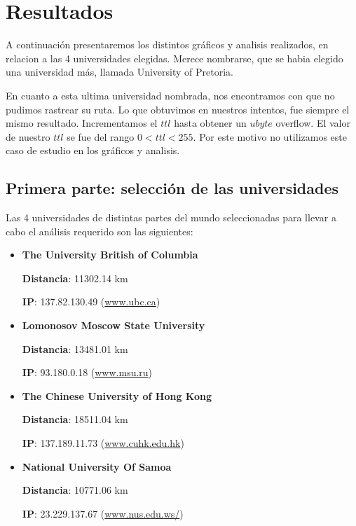 \section{Resultados}	
A continuaci\'on presentaremos los distintos gr\'aficos y analisis realizados, en relacion a las 4 universidades elegidas. Merece nombrarse, que se habia elegido una universidad m\'as, llamada University of Pretoria.

En cuanto a esta ultima universidad nombrada, nos encontramos con que no pudimos rastrear su ruta. Lo que obtuvimos en nuestros intentos, fue siempre el mismo resultado. Incrementamos el $ttl$ hasta obtener un $ubyte$ overflow. El valor de nuestro $ttl$ se fue del rango $0 < ttl < 255$.
Por este motivo no utilizamos este caso de estudio en los gr\'aficos y analisis.






\subsection{Primera parte: selección de las universidades}
Las 4 universidades de distintas partes del mundo seleccionadas para llevar a cabo el análisis requerido son las siguientes: 

\begin{itemize}
 \item {\bf The University British of Columbia}
 
	{\bf Distancia}: 11302.14 km 
	
	{\bf IP}: 137.82.130.49 (\url{www.ubc.ca}{})
 
 \item {\bf Lomonosov Moscow State University}

	{\bf Distancia}: 13481.01 km
	
	{\bf IP}: 93.180.0.18 (\url{www.msu.ru}{})
 
 \item {\bf The Chinese University of Hong Kong}

	{\bf Distancia}: 18511.04 km
	
	{\bf IP}: 137.189.11.73 (\url{www.cuhk.edu.hk})
 
 \item {\bf National University Of Samoa}
 
	{\bf Distancia}: 10771.06 km
	
	{\bf IP}: 23.229.137.67 (\url{www.nus.edu.ws/}{})
 
\end{itemize}

